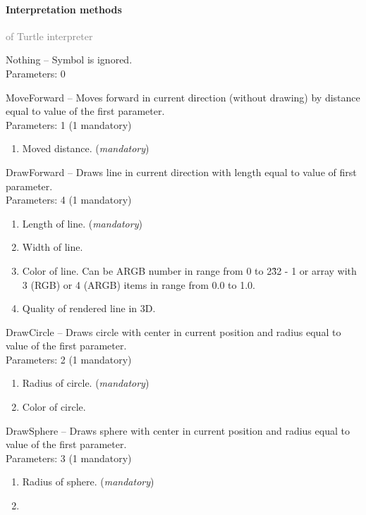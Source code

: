 	\paragraph{Interpretation methods}\textcolor{gray}{of Turtle interpreter}
	\begin{description*}
		\item[Nothing]
			-- Symbol is ignored.
		\\ Parameters: 0 
		\item[MoveForward]
			-- Moves forward in current direction (without drawing) by distance equal to value of the first parameter.
		\\ Parameters: 1  (1 mandatory) 
			\begin{enumerate}
				\item
Moved distance. (\textit{mandatory}) 			\end{enumerate}
		\item[DrawForward]
			-- Draws line in current direction with length equal to value of first parameter.
		\\ Parameters: 4  (1 mandatory) 
			\begin{enumerate}
				\item
Length of line. (\textit{mandatory}) 				\item
            Width of line.				\item
            Color of line. Can be ARGB number in range from 0 to 2\^32 - 1 or array with 3 (RGB) or 4 (ARGB) items in range from 0.0 to 1.0.				\item
            Quality of rendered line in 3D.			\end{enumerate}
		\item[DrawCircle]
			-- Draws circle with center in current position and radius equal to value of the first parameter.
		\\ Parameters: 2  (1 mandatory) 
			\begin{enumerate}
				\item
Radius of circle. (\textit{mandatory}) 				\item
            Color of circle.			\end{enumerate}
		\item[DrawSphere]
			-- Draws sphere with center in current position and radius equal to value of the first parameter.
		\\ Parameters: 3  (1 mandatory) 
			\begin{enumerate}
				\item
Radius of sphere. (\textit{mandatory}) 				\item

\end{enumerate}
\end{description*}
